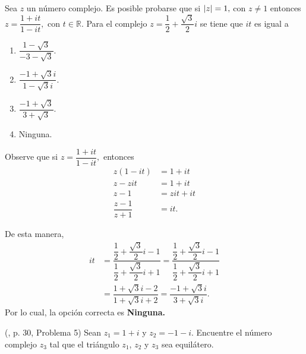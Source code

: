 \begin{prob} Sea $z$ un número complejo. Es posible probarse que si $\left\vert z\right\vert=1,$ con $z\neq 1$ entonces $z=\dfrac{1+it}{1-it},$ con $t\in \mathbb{R}.$  Para el complejo $z=\dfrac{1}{2}+\dfrac{\sqrt{3}}{2}i$ se tiene que  $it$ es igual a %
				\begin{multicols}{4}
					\begin{enumerate}[$(a)$]
						\item $ \dfrac{ 1-\sqrt{3}}{-3-\sqrt{3}}.$  
						\item $ \dfrac{-1+\sqrt{3}i}{1-\sqrt{3}i}.$  
						\item $ \dfrac{-1+\sqrt{3}}{3+\sqrt{3}}.$  %
						\item Ninguna.
					\end{enumerate}
				\end{multicols}							
\begin{myproof}
Observe que si $z=\dfrac{1+it}{1-it},$ entonces 
\begin{align*}
z\left( 1-it \right)&=1+it\\
z-zit&=1+it\\
z-1&=zit+it\\
\dfrac{z-1}{z+1}&=it.
\end{align*}

De esta manera, \begin{align*} it&=\dfrac{\dfrac{1}{2}+\dfrac{\sqrt{3}}{2}i-1}{\dfrac{1}{2}+\dfrac{\sqrt{3}}{2}i+1}=\dfrac{\dfrac{1}{2}+\dfrac{\sqrt{3}}{2}i-1}{\dfrac{1}{2}+\dfrac{\sqrt{3}}{2}i+1}\\
&=\dfrac{1+\sqrt{3}i-2}{1+\sqrt{3}i+2}=\boxed{\dfrac{-1+\sqrt{3}i}{3+\sqrt{3}i}}.
\end{align*}
Por lo cual, la opción correcta es \textbf{Ninguna.}
\end{myproof}
\end{prob}

\begin{prob}  (\cite{andreescu2014complex}, p. 30, Problema 5)
Sean $z_1 = 1+i$ y $z_2 = -1-i$. Encuentre el número complejo $z_3$ tal que el triángulo $z_1$, $z_2$ y $z_3$ sea equilátero.
\end{prob}

